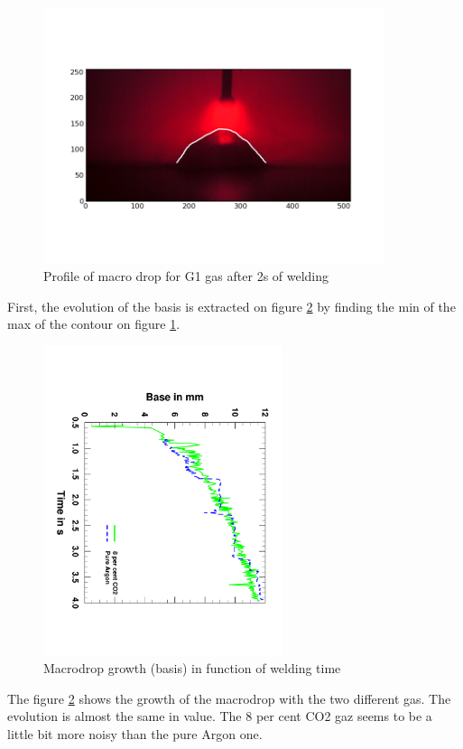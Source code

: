 \documentclass[12pt]{iopart}
\begin{document}
\begin{figure}[h!]
\centering    
\includegraphics[width=10cm]{images/CO2_2s.png}
\caption{Profile of macro drop for G1 gas after 2s of welding}
\label{fig::profile_extract}
\end{figure}

First, the evolution of the basis is extracted on figure \ref{fig::basis} by finding 
the min of the max of the contour on figure \ref{fig::profile_extract}.

\begin{figure}[h!]
\centering    
\includegraphics[width=7cm,angle=90]{images/Evolution_Base_Gazs.pdf}
\caption{Macrodrop growth (basis) in function of welding time}
\label{fig::basis}
\end{figure}

The figure \ref{fig::basis} shows the growth of the macrodrop with the two different gas.
The evolution is almost the same in value. The 8 per cent CO2 gaz seems to be a little bit 
more noisy than the pure Argon one. 
\end{document}
